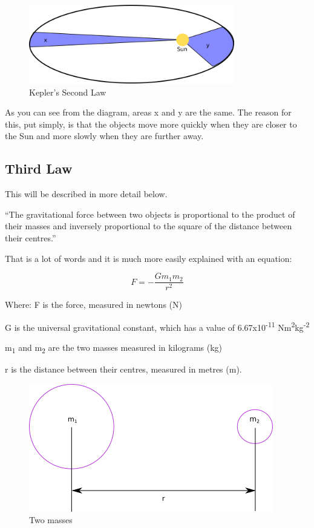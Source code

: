 \documentclass[main.tex]{subfiles}
\begin{document}
\begin{figure}[h]
  \begin{center}
    \includegraphics[width=0.8\textwidth]{figs/chapt-13/kepler-2.png}
  \end{center}
  \caption{Kepler's Second Law}
  \label{kepler-2}
\end{figure}

As you can see from the diagram, areas x and y are the same. The reason
for this, put simply, is that the objects move more quickly when they
are closer to the Sun and more slowly when they are further away.

\subsection{Third Law}

This will be described in more detail below.



``The gravitational force between two objects is proportional to the
product of their masses and inversely proportional to the square of the
distance between their centres.''

That is a lot of words and it is much more easily explained with an
equation:

\[F = - \frac{Gm_{1}m_{2}}{r^{2}}\]

Where: F is the force, measured in newtons (N)

G is the universal gravitational constant, which has a value of
6.67x10\textsuperscript{-11} Nm\textsuperscript{2}kg\textsuperscript{-2}

m\textsubscript{1} and m\textsubscript{2} are the two masses measured in
kilograms (kg)

r is the distance between their centres, measured in metres (m).

\begin{figure}[h]
  \begin{center}
    \includegraphics{figs/chapt-13/masses.png}
  \end{center}
  \label{masses}
  \caption{Two masses}
\end{figure}
\end{document}
